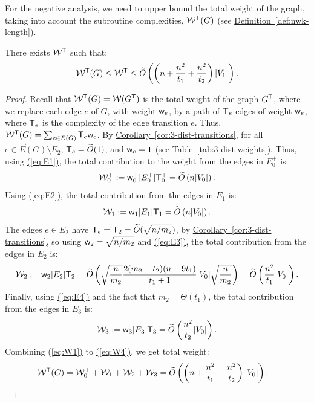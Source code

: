 \documentclass{theoretics}
\newcommand{\eq}[1]{\hyperref[eq:#1]{(\ref*{eq:#1})}}
\newcommand{\cor}[1]{\hyperref[cor:#1]{Corollary~\ref*{cor:#1}}}
\newcommand{\tabl}[1]{\hyperref[tab:#1]{Table~\ref*{tab:#1}}}
\newcommand{\defin}[1]{\hyperref[def:#1]{Definition~\ref*{def:#1}}}
\renewcommand{\>}{\rangle}
\newcommand{\<}{\langle}
\renewcommand{\(}{\left(}
\renewcommand{\)}{\right)}
\def\w{{\sf w}}
\begin{document}
For the negative analysis, we need to upper bound the total weight of the graph, taking into account the subroutine complexities, ${\cal W}^{\sf T}(G)$ (see \defin{nwk-length}).
\begin{lemma}\label{lem:3-dist-negative}
There exists  ${\cal W}^{\sf T}$ such that:
$${\cal W}^{\sf T}(G)\leq {\cal W}^{\sf T}\leq \widetilde{O}\left(\left(n + \frac{n^2}{t_1} +\frac{n^2}{t_2}\right)|V_1|\right).$$
\end{lemma}
\begin{proof}
Recall that ${\cal W}^{\sf T}(G)={\cal W}(G^{\sf T})$ is the total weight of the graph $G^{\sf T}$, where we replace each edge $e$ of $G$, with weight $\w_e$, by a path of ${\sf T}_e$ edges of weight $\w_e$, where ${\sf T}_e$ is the complexity of the edge transition $e$. Thus, ${\cal W}^{\sf T}(G)=\sum_{e\in E(G)}{\sf T}_e\w_e$. By \cor{3-dist-transitions}, for all $e\in \overrightarrow{E}(G)\setminus E_2$, ${\sf T}_e=\widetilde{O}(1)$, and $\w_e=1$ (see \tabl{3-dist-weights}). Thus, using \eq{E1}, the total contribution to the weight from the edges in $E_0^+$ is:
\begin{equation}
{\cal W}_0^+ := \w_0^+|E_0^+|{\sf T}_0^+=\widetilde{O}\left({n}|V_0|\right).\label{eq:W1}
\end{equation}
Using \eq{E2}, the total contribution from the edges in $E_1$ is:
\begin{equation}
{\cal W}_1:= \w_1|E_1|{\sf T}_1 = \widetilde{O}\left(n|V_0|\right).\label{eq:W2}
\end{equation}
The edges $e\in E_2$ have ${\sf T}_e={\sf T}_2=\widetilde{O}(\sqrt{n/m_2})$, by \cor{3-dist-transitions}, so using $\w_2=\sqrt{n/m_2}$ and \eq{E3}, the total contribution from the edges in $E_2$ is:
\begin{equation}
{\cal W}_2:= \w_2|E_2|{\sf T}_2 =\widetilde{O}\left(\sqrt{\frac{n}{m_2}}\frac{2(m_2-t_2)(n-9t_1)}{t_1+1}|V_0|\sqrt{\frac{n}{m_2}}\right)
=\widetilde{O}\left(\frac{n^2}{t_1}|V_0|\right).\label{eq:W3}
\end{equation}
Finally, using \eq{E4} and the fact that $m_2=\Theta(t_1)$, the total contribution from the edges in $E_3$ is:
\begin{equation}
{\cal W}_3:= \w_3|E_3|{\sf T}_3 = \widetilde{O}\left(\frac{n^2}{t_2}|V_0|\right).\label{eq:W4}
\end{equation}
Combining \eq{W1} to \eq{W4}, we get total weight:
\begin{align*}
{\cal W}^{\sf T}(G) &= {\cal W}_0^++{\cal W}_1+{\cal W}_2+{\cal W}_3
 = \widetilde{O}\left(\left(n + \frac{n^2}{t_1}+\frac{n^2}{t_2}\right)|V_0| \right).\qedhere
\end{align*}
\end{proof}
\end{document}

